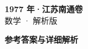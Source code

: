 \documentclass[zihao=-4, a4paper]{ctexart}
\begin{document}
\begin{center}
  {\Large\bfseries 1977 年·江苏南通卷}\\[4pt]
  {\large 数学 · 解析版}
\end{center}
\medskip
{}

\clearpage
{}
\begin{center}{\Large\bfseries 参考答案与详细解析}\end{center}
\medskip

\end{document}
